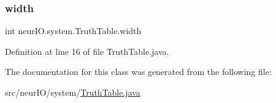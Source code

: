 \subsubsection{\texorpdfstring{width}{width}}
{\footnotesize\ttfamily int neur\+I\+O.\+system.\+Truth\+Table.\+width}



Definition at line 16 of file Truth\+Table.\+java.



The documentation for this class was generated from the following file\+:\begin{DoxyCompactItemize}
\item 
src/neur\+I\+O/system/\hyperlink{_truth_table_8java}{Truth\+Table.\+java}\end{DoxyCompactItemize}
